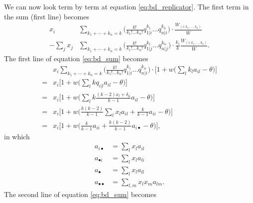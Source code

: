 \documentclass[14pt, justified]{tufte-handout}
\begin{document}
We can now look term by term at equation \ref{eq:bd_replicator}.
The first term in the sum (first line) becomes
\begin{equation}
    \begin{split}
        x_i & \sum_{k_1 + \cdots + k_n = k} \Big( \frac{k!}{k_1! \ldots k_n!} q_{1|i}^{k_1} \ldots q_{n|i}^{k_n} \Big) \cdot \frac{W_{(i; k_1, \ldots ,k_n)}}{\bar{W}}
        \\
        - \sum_j x_j & \sum_{k_1 + \cdots + k_n = k} \Big( \frac{k!}{k_1! \ldots k_n!} q_{1|j}^{k_1} \ldots q_{n|j}^{k_n} \Big) \cdot \frac{k_i}{k} \frac{W_{(i; k_1, \ldots ,k_n)}}{\bar{W}}.
    \end{split}
    \label{eq:bd_sum}
\end{equation}
The first line of equation \ref{eq:bd_sum} becomes
\begin{equation}
    \begin{split}
        & x_i \sum_{k_1 + \cdots + k_n = k} \Big( \frac{k!}{k_1! \ldots k_n!} q_{1|i}^{k_1} \ldots q_{n|i}^{k_n} \Big) \cdot \Big[ 1 + w \Big( \sum_l k_l a_{il} - \theta \Big) \Big]
        \\
        = & x_i \Big[ 1 + w \Big( \sum_l kq_{i|l} a_{il} - \theta \Big) \Big]
        \\
        = & x_i \Big[ 1 + w \Big( \sum_l k \frac{(k-2)x_l + \delta_{li}}{k-1} a_{il} - \theta \Big) \Big]
        \\
        = & x_i \Big[ 1 + w \Big( \frac{k(k-2)}{k-1} \sum_l x_l a_{il} + \frac{k}{k-1} a_{ii} - \theta \Big) \Big]
        \\
        = & x_i \Big[ 1 + w \Big( \frac{k}{k-1} a_{ii} + \frac{k(k-2)}{k-1} a_{i \bullet } - \theta \Big) \Big],
    \end{split}
    \label{eq:bd_sum_1}
\end{equation}
in which
\begin{equation}
    \begin{split}
        a_{i \bullet} & = \sum_l x_l a_{il}
        \\
        a_{\bullet i} & = \sum_l x_l a_{li}
        \\
        a_{\bullet} & = \sum_l x_l a_{ll}
        \\
        a_{\bullet \bullet} & = \sum_{l,m} x_l x_m a_{lm}.
    \end{split}
\end{equation}
The second line of equation \ref{eq:bd_sum} becomes
\end{document}
